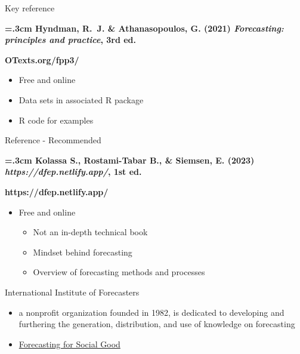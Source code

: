 \documentclass[
  14pt,
  ignorenonframetext,
  aspectratio=169,
]{beamer}
\providecommand{\tightlist}{%
  \setlength{\itemsep}{0pt}\setlength{\parskip}{0pt}}\usepackage{longtable,booktabs,array}
\begin{document}
\begin{frame}{Key reference}
\protect\hypertarget{key-reference}{}
\large

\begin{block}{}\bf
{}\hangindent=.3cm
 {Hyndman, R.~J. \& Athanasopoulos, G. (2021) \emph{Forecasting: principles and practice}, 3rd ed.}
\end{block}\pause
\begin{alertblock}{}\Large
\centerline{\bf OTexts.org/fpp3/}
\end{alertblock}

\pause

\begin{itemize}
\tightlist
\item
  Free and online
\item
  Data sets in associated R package
\item
  R code for examples
\end{itemize}
\end{frame}

\begin{frame}{Reference - Recommended}
\protect\hypertarget{reference---recommended}{}
\large

\begin{block}{}\bf
{}\hangindent=.3cm
 {Kolassa S., Rostami-Tabar B., \& Siemsen, E. (2023) \emph{https://dfep.netlify.app/}, 1st ed.}
\end{block}\pause
\begin{alertblock}{}\Large
\centerline{\bf https://dfep.netlify.app/}
\end{alertblock}

\pause
\fontsize{11}{11}\sf

\begin{itemize}
\tightlist
\item
  Free and online

  \begin{itemize}
  \tightlist
  \item
    Not an in-depth technical book
  \item
    Mindset behind forecasting
  \item
    Overview of forecasting methods and processes
  \end{itemize}
\end{itemize}
\end{frame}

\begin{frame}{International Institute of Forecasters}
\protect\hypertarget{international-institute-of-forecasters}{}
\begin{itemize}
\item
  a nonprofit organization founded in 1982, is dedicated to developing
  and furthering the generation, distribution, and use of knowledge on
  forecasting
\item
  \href{https://www.f4sg.org/}{Forecasting for Social Good}
\end{itemize}
\end{frame}
\end{document}
